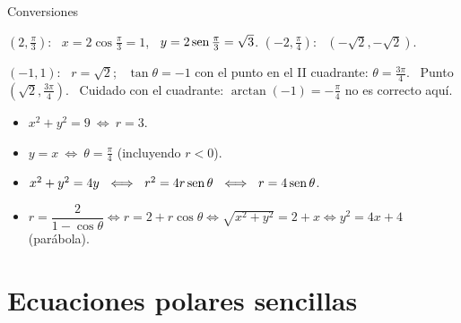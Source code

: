 \documentclass[10pt,aspectratio=169]{beamer}
\begin{document}
\begin{frame}{Conversiones}
  \begin{ejemplo}
    $\left(2,\frac{\pi}{3}\right)$: \ $x=2\cos\frac\pi3=1$, \ $y=2\operatorname{sen}\frac\pi3=\sqrt3$. \qquad
    $\left(-2,\frac\pi4\right)$: \ $(-\sqrt2,-\sqrt2)$.
  \end{ejemplo}
  \begin{ejemplo}
    $(-1,1)$: \ $r=\sqrt2$; \ $\tan\theta=-1$ con el punto en el II cuadrante: $\theta=\frac{3\pi}{4}$. \ Punto $\left(\sqrt2,\frac{3\pi}4\right)$.
    \ \alert{Cuidado} con el cuadrante: $\arctan(-1)=-\frac\pi4$ no es correcto aquí.
  \end{ejemplo}
  \begin{ejemplo}[3: ecuaciones]
    \begin{itemize}
      \item $x^2+y^2=9\ \iff\ r=3$.
      \item $y=x\ \iff\ \theta=\frac\pi4$ (incluyendo $r<0$).
      \item $x^2+y^2=4y\ \iff\ r^2=4r\sen\theta\ \iff\ r=4\sen\theta$.
      \item $r=\dfrac{2}{1-\cos\theta}\iff r=2+r\cos\theta\iff\sqrt{x^2+y^2}=2+x\iff y^2=4x+4$ (parábola).
    \end{itemize}
  \end{ejemplo}
\end{frame}

\section{Ecuaciones polares sencillas}
\end{document}

